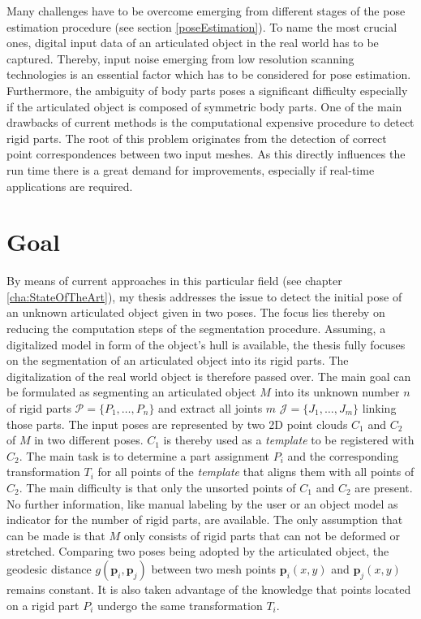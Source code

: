 Many challenges have to be overcome emerging from different stages of the pose estimation procedure (see section \ref{poseEstimation}). To name the most crucial ones, digital input data of an articulated object in the real world has to be captured. Thereby, input noise emerging from low resolution scanning technologies is an essential factor which has to be considered for pose estimation. Furthermore, the ambiguity of body parts poses a significant difficulty especially if the articulated object is composed of symmetric body parts. One of the main drawbacks of current methods is the computational expensive procedure to detect rigid parts. The root of this problem originates from the detection of correct point correspondences between two input meshes. As this directly influences the run time there is a great demand for improvements, especially if real-time applications are required.

\section{Goal}
By means of current approaches in this particular field (see chapter \ref{cha:StateOfTheArt}), my thesis addresses the issue to detect the initial pose of an unknown articulated object given in two poses. The focus lies thereby on reducing the computation steps of the segmentation procedure. Assuming, a digitalized model in form of the object's hull is available, the thesis fully focuses on the segmentation of an articulated object into its rigid parts. The digitalization of the real world object is therefore passed over. The main goal can be formulated as segmenting an articulated object $M$ into its unknown number $n$ of rigid parts $\mathcal{P} =  \{P_1,\ldots,P_n\}$ and extract all joints $m$ $\mathcal{J} =  \{J_1,\ldots,J_m\}$ linking those parts. The input poses are represented by two 2D point clouds $C_1$ and $C_2$ of $M$ in two different poses. $C_1$ is thereby used as a \textit{template} to be registered with $C_2$. The main task is to determine a part assignment $P_i$ and the corresponding transformation $T_i$ for all points of the \textit{template} that aligns them with all points of $C_2$. The main difficulty is that only the unsorted points of $C_1$ and $C_2$ are present. No further information, like manual labeling by the user or an object model as indicator for the number of rigid parts, are available. The only assumption that can be made is that $M$ only consists of rigid parts that can not be deformed or stretched. Comparing two poses being adopted by the articulated object, the geodesic distance $g(\boldsymbol{p}_i,\boldsymbol{p}_j)$ between two mesh points $\boldsymbol{p}_i(x,y)$ and $\boldsymbol{p}_j(x,y)$ remains constant. It is also taken advantage of the knowledge that points located on a rigid part $P_i$ undergo the same transformation $T_i$.

